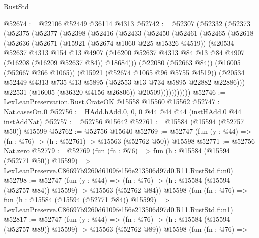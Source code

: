\begin{lexlean}{RustStd}
\begin{coremodule}
@52674 := @22106 @52449 @36114 @4313
@52742 := @52307
    (@52332
      (@52373
        (@52375
          (@52377
            (@52398
              (@52416
                (@52433
                  (@52450
                    (@52461
                      (@52465
                        (@52618
                          (@52636
                            (@52671
                              (@15921 (@52674 @1060 @225 @15326 @4519))
                              (@20534
                                @52637
                                @4313
                                @154
                                @13
                                @4907
                                (@16200
                                  @52637
                                  @4313
                                  @84
                                  @13
                                  @84
                                  @4907
                                  (@16208 (@16209 @52637 @84))
                                  @18684)))
                            (@22080 (@52663 @84))
                            (@16005 (@52667 @266 @1065))
                            (@15921 (@52674 @1065 @96 @5755 @4519))
                            (@20534
                              @52449
                              @4313
                              @735
                              @13
                              @5895
                              (@52553 @13 @734 @5895 @22882 @22886)))
                          @22531
                          (@16005 (@36320 @4156 @26806))
                          @20509)))))))))))
@52746 := LexLeanPreservation.Rust.CrateOK @15558 @15560 @15562
@52747 := Nat.casesOn.{0}
@52756 := HAdd.hAdd.{0, 0, 0} @44 @44 @44 (instHAdd.{0} @44 instAddNat)
@52757 := @52756 @15642
@52761 := @15584 (@15594 (@52757 @50)) @15599
@52762 := @52756 @15640
@52769 := @52747 (fun (y : @44) => (fn : @76) -> (h : @52761) -> @15563 (@52762 @50)) @15598
@52771 := @52756 Nat.zero
@52779 := @52769
    (fun (fn : @76) =>
    fun (h : @15584 (@15594 (@52771 @50)) @15599) =>
    LexLeanPreserve.C86697b9260d6109fe156e213506d97d0.R11.RustStd.fun0)
@52798 := @52747
    (fun (y : @44) =>
    (fn : @76) -> (h : @15584 (@15594 (@52757 @84)) @15599) -> @15563 (@52762 @84))
    @15598
    (fun (fn : @76) =>
    fun (h : @15584 (@15594 (@52771 @84)) @15599) =>
    LexLeanPreserve.C86697b9260d6109fe156e213506d97d0.R11.RustStd.fun1)
@52817 := @52747
    (fun (y : @44) =>
    (fn : @76) -> (h : @15584 (@15594 (@52757 @89)) @15599) -> @15563 (@52762 @89))
    @15598
    (fun (fn : @76) =>

\end{coremodule}
\end{lexlean}
